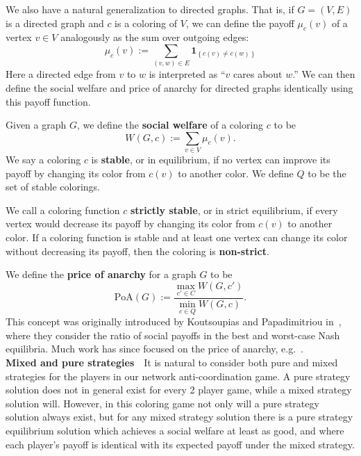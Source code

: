 \documentclass{llncs}
\newcommand{\ind}[1]{\textbf{1}_{\left \{ #1 \right \}}}
\begin{document}
We also have a natural generalization to directed graphs.  That is, if $G =
(V,E)$ is a directed graph and $c$ is a coloring of $V$, we can define the
payoff $\mu_c(v)$ of a vertex $v \in V$ analogously as the sum over outgoing
edges:
\[ 
	\mu_c(v) := \sum_{(v,w) \in E} \ind{c(v) \neq c(w)}
\]
Here a directed edge from $v$ to $w$ is interpreted as ``$v$ cares about $w$.''
We can then define the social welfare and price of anarchy for directed graphs
identically using this payoff function. 

Given a graph $G$, we define the \textbf{social welfare} of a coloring $c$ to
be
\[
   W(G,c) := \sum_{v \in V} \mu_c(v).
\]
We say a coloring $c$ is \textbf{stable}, or in {equilibrium}, if no vertex can
improve its payoff by changing its color from $c(v)$ to another color. We
define $Q$ to be the set of stable colorings.

We call a coloring function $c$ \textbf{strictly stable}, or in {strict
equilibrium}, if every vertex would decrease its payoff by changing its color
from $c(v)$ to another color. If a coloring function is stable and at least one
vertex can change its color without decreasing its payoff, then the coloring is
\textbf{non-strict}.


We define the \textbf{price of anarchy} for a graph $G$ to be
\[
\mbox{PoA}(G) := \frac{\max_{c' \in C}W(G,c')}
{\min_{c \in Q}W(G,c)}.
\]
This concept
was originally introduced by Koutsoupias and
Papadimitriou in~\cite{KP99}, where they consider the ratio of social payoffs in
the best and worst-case Nash equilibria. Much work has since focused on the price of anarchy, 
e.g.~\cite{FKKMS02,RT02}.\\

\noindent \textbf{Mixed and pure strategies}\ \
It is natural to consider both pure and mixed strategies for the players in our
network anti-coordination game.  A pure strategy solution does not in general
exist for every 2 player game, while a mixed strategy solution will.  However,
in this coloring game not only will
a pure strategy solution always exist, but for any mixed strategy solution
there is a pure strategy equilibrium solution which achieves a social welfare
at least as good, and where each player's payoff is identical with its
expected payoff under the mixed strategy.\\
\end{document}
